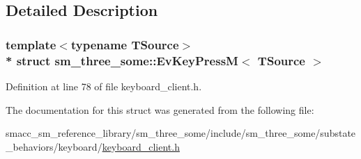 \subsection{Detailed Description}
\subsubsection*{template$<$typename T\+Source$>$\\*
struct sm\+\_\+three\+\_\+some\+::\+Ev\+Key\+Press\+M$<$ T\+Source $>$}



Definition at line 78 of file keyboard\+\_\+client.\+h.



The documentation for this struct was generated from the following file\+:\begin{DoxyCompactItemize}
\item 
smacc\+\_\+sm\+\_\+reference\+\_\+library/sm\+\_\+three\+\_\+some/include/sm\+\_\+three\+\_\+some/substate\+\_\+behaviors/keyboard/\hyperlink{keyboard__client_8h}{keyboard\+\_\+client.\+h}\end{DoxyCompactItemize}
